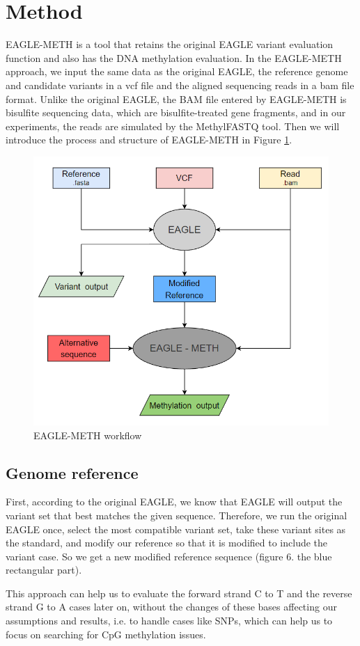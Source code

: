 \documentclass{PHlab-thesis}
\begin{document}
\section{Method}
EAGLE-METH is a tool that retains the original EAGLE variant evaluation function and also has the DNA methylation evaluation.
In the EAGLE-METH approach, we input the same data as the original EAGLE, the reference genome and candidate variants in a vcf file and the aligned sequencing reads in a bam file format. Unlike the original EAGLE, the BAM file entered by EAGLE-METH is bisulfite sequencing data, which are bisulfite-treated gene fragments, and in our experiments, the reads are simulated by the MethylFASTQ tool. Then we will introduce the process and structure of EAGLE-METH in Figure \ref{fig:EAGLE-METH}.

\begin{figure}[h]
  \centering
  \includegraphics[scale=0.8]{figures/eagle_workflow_v2.PNG}
  \caption{EAGLE-METH workflow}
  \label{fig:EAGLE-METH}
\end{figure}

\subsection{Genome reference}
First, according to the original EAGLE, we know that EAGLE will output the variant set that best matches the given sequence. Therefore, we run the original EAGLE once, select the most compatible variant set, take these variant sites as the standard, and modify our reference so that it is modified to include the variant case. So we get a new modified reference sequence (figure 6. the blue rectangular part).
\par This approach can help us to evaluate the forward strand C to T and the reverse strand G to A cases later on, without the changes of these bases affecting our assumptions and results, i.e. to handle cases like SNPs, which can help us to focus on searching for CpG methylation issues.
\end{document}
